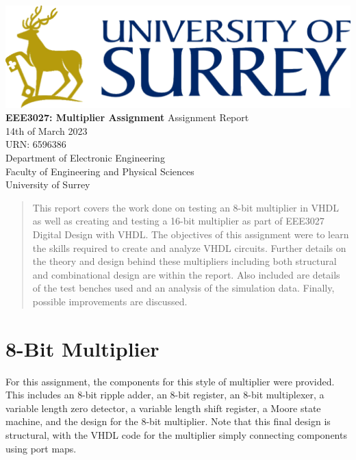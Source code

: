 \documentclass[11pt]{article}
\begin{document}
\begin{titlepage}
    \begin{center}
    \includegraphics[width=\textwidth]{Logo.png} %
    \vfill
    \Huge
    \textbf{EEE3027: Multiplier Assignment}
    \vfill
    \huge
    Assignment Report\\
    \vspace{1cm}
    \Large
    14th of March 2023\\
    URN: 6596386\\
    \vfill
    \vfill
    \Large
    Department of Electronic Engineering\\
    Faculty of Engineering and Physical Sciences\\
    University of Surrey\\
    \end{center}
\end{titlepage}

\begin{abstract}
This report covers the work done on testing an 8-bit multiplier in VHDL as well as creating and testing a 16-bit multiplier
as part of EEE3027 Digital Design with VHDL.
The objectives of this assignment were to learn the skills required to create and analyze VHDL circuits. 
Further details on the theory and design behind these multipliers including both structural and combinational design are within the report. 
Also included are details of the test benches used and an analysis of the simulation data.
Finally, possible improvements are discussed.

\vspace{1cm}
\end{abstract}
\tableofcontents
\pagebreak

\section{8-Bit Multiplier}
For this assignment, the components for this style of multiplier were provided.
This includes an 8-bit ripple adder, an 8-bit register, an 8-bit multiplexer, a variable length zero detector, a variable length shift register, a Moore state machine,
and the design for the 8-bit multiplier.
Note that this final design is structural, with the VHDL code for the multiplier simply connecting components using port maps.
\end{document}
